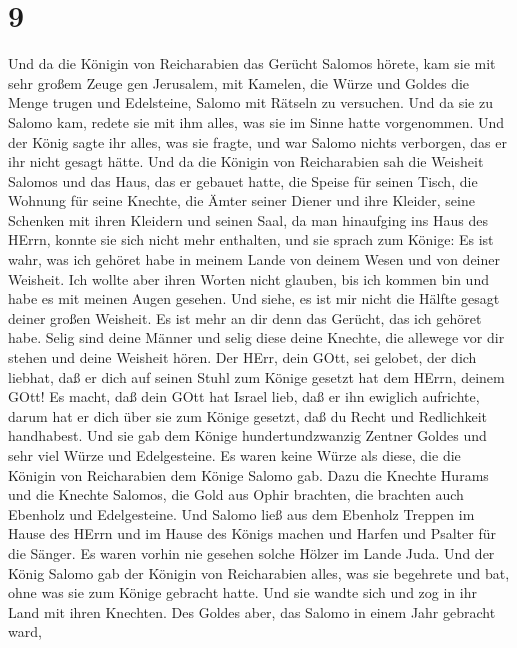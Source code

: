 \hypertarget{section-8}{%
\section{9}\label{section-8}}

 Und da die Königin von Reicharabien das Gerücht Salomos
hörete, kam sie mit sehr großem Zeuge gen Jerusalem, mit Kamelen, die
Würze und Goldes die Menge trugen und Edelsteine, Salomo mit Rätseln zu
versuchen. Und da sie zu Salomo kam, redete sie mit ihm alles, was sie
im Sinne hatte vorgenommen.  Und der König sagte ihr alles,
was sie fragte, und war Salomo nichts verborgen, das er ihr nicht gesagt
hätte.  Und da die Königin von Reicharabien sah die Weisheit
Salomos und das Haus, das er gebauet hatte,  die Speise für
seinen Tisch, die Wohnung für seine Knechte, die Ämter seiner Diener und
ihre Kleider, seine Schenken mit ihren Kleidern und seinen Saal, da man
hinaufging ins Haus des HErrn, konnte sie sich nicht mehr enthalten,
 und sie sprach zum Könige: Es ist wahr, was ich gehöret
habe in meinem Lande von deinem Wesen und von deiner Weisheit.
 Ich wollte aber ihren Worten nicht glauben, bis ich kommen
bin und habe es mit meinen Augen gesehen. Und siehe, es ist mir nicht
die Hälfte gesagt deiner großen Weisheit. Es ist mehr an dir denn das
Gerücht, das ich gehöret habe.  Selig sind deine Männer und
selig diese deine Knechte, die allewege vor dir stehen und deine
Weisheit hören.  Der HErr, dein GOtt, sei gelobet, der dich
liebhat, daß er dich auf seinen Stuhl zum Könige gesetzt hat dem HErrn,
deinem GOtt! Es macht, daß dein GOtt hat Israel lieb, daß er ihn
ewiglich aufrichte, darum hat er dich über sie zum Könige gesetzt, daß
du Recht und Redlichkeit handhabest.  Und sie gab dem Könige
hundertundzwanzig Zentner Goldes und sehr viel Würze und Edelgesteine.
Es waren keine Würze als diese, die die Königin von Reicharabien dem
Könige Salomo gab.  Dazu die Knechte Hurams und die Knechte
Salomos, die Gold aus Ophir brachten, die brachten auch Ebenholz und
Edelgesteine.  Und Salomo ließ aus dem Ebenholz Treppen im
Hause des HErrn und im Hause des Königs machen und Harfen und Psalter
für die Sänger. Es waren vorhin nie gesehen solche Hölzer im Lande Juda.
 Und der König Salomo gab der Königin von Reicharabien
alles, was sie begehrete und bat, ohne was sie zum Könige gebracht
hatte. Und sie wandte sich und zog in ihr Land mit ihren Knechten.
 Des Goldes aber, das Salomo in einem Jahr gebracht ward,
